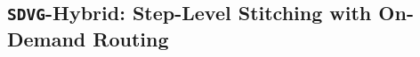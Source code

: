 \documentclass{article} %
\newcommand{\Drafter}{\mathcal{D}}
\newcommand{\Target}{\mathcal{T}}
\newcommand{\score}{q}
\newcommand{\threshold}{\tau}
\begin{document}


\subsection{\texttt{SDVG}-Hybrid: Step-Level Stitching with On-Demand Routing}
\label{sec:hybrid}
\end{document}
